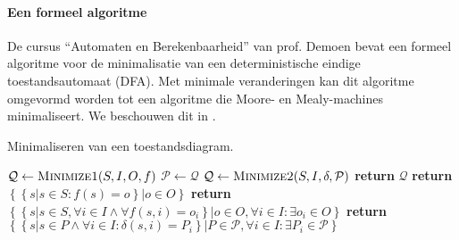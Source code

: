 \paragraph{Een formeel algoritme}
De cursus ``Automaten en Berekenbaarheid'' van prof. Demoen\cite{aenb10} bevat een formeel algoritme voor de minimalisatie van een deterministische eindige toestandsautomaat (DFA). Met minimale veranderingen kan dit algoritme omgevormd worden tot een algoritme die Moore- en Mealy-machines minimaliseert. We beschouwen dit in .

\begin{algorithm}[hbt]
\caption{Minimaliseren van een toestandsdiagram.}\label{alg:minimizeFSM}
\begin{algorithmic}[1]
\State $\mathcal{Q}\gets\Call{Minimize1}{S,I,O,f}$
\Repeat
\State $\mathcal{P}\gets\mathcal{Q}$
\State $\mathcal{Q}\gets\Call{Minimize2}{S,I,\delta,\mathcal{P}}$
\State \textbf{return} $\mathcal{Q}$
\EndProcedure
{}
\State \textbf{return} $\left\{\left\{s|s\in S:f\left(s\right)=o\right\}|o\in O\right\}$
\EndFunction
{}
\State \textbf{return} $\left\{\left\{s|s\in S,\forall i\in I\wedge\forall f\left(s,i\right)=o_i\right\}|o\in O,\forall i\in I:\exists o_i\in O\right\}$
\EndFunction
{}
\State \textbf{return} $\left\{\left\{s|s\in P\wedge \forall i \in I:\delta\left(s,i\right)=P_i\right\}|P\in\mathcal{P},\forall i\in I:\exists P_i\in\mathcal{P}\right\}$
\EndFunction
\end{algorithmic}
\end{algorithm}

